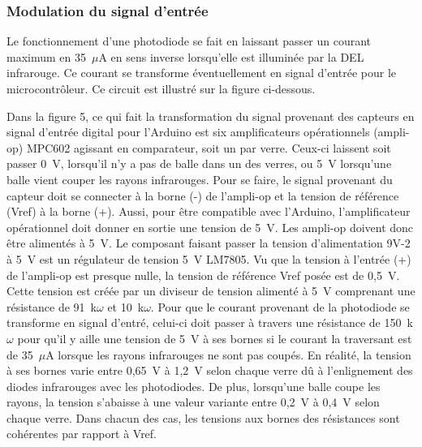 \subsubsection{Modulation du signal d’entrée}

Le fonctionnement d’une photodiode se fait en laissant passer un courant maximum en 35~$\mu$A en sens inverse lorsqu’elle est illuminée par la DEL infrarouge.
Ce courant se transforme éventuellement en signal d’entrée pour le microcontrôleur.
Ce circuit est illustré sur la figure ci-dessous.


Dans la figure 5, ce qui fait la transformation du signal provenant des capteurs en signal d’entrée digital pour l’Arduino est six amplificateurs opérationnels (ampli-op) MPC602 agissant en comparateur, soit un par verre.
Ceux-ci laissent soit passer 0~V, lorsqu’il n’y a pas de balle dans un des verres, ou 5~V lorsqu’une balle vient couper les rayons infrarouges.
Pour se faire, le signal provenant du capteur doit se connecter à la borne (-) de l’ampli-op et la tension de référence (Vref) à la borne (+).
Aussi, pour être compatible avec l’Arduino, l’amplificateur opérationnel doit donner en sortie une tension de 5~V.
Les ampli-op doivent donc être alimentés à 5~V.
Le composant faisant passer la tension d’alimentation 9V-2 à 5~V est un régulateur de tension 5~V LM7805.
Vu que la tension à l’entrée (+) de l’ampli-op est presque nulle, la tension de référence Vref posée est de 0,5~V.
Cette tension est créée par un diviseur de tension alimenté à 5~V comprenant une résistance de 91~k$\omega$ et 10~k$\omega$.
Pour que le courant provenant de la photodiode se transforme en signal d'entré, celui-ci doit passer à travers une résistance de 150~k$\omega$ pour qu’il y aille une tension de 5~V à ses bornes si le courant la traversant est de 35~$\mu$A lorsque les rayons infrarouges ne sont pas coupés.
En réalité, la tension à ses bornes varie entre 0,65~V à 1,2~V selon chaque verre dû à l’enlignement des diodes infrarouges avec les photodiodes.
De plus, lorsqu’une balle coupe les rayons, la tension s’abaisse à une valeur variante entre 0,2~V à 0,4~V selon chaque verre.
Dans chacun des cas, les tensions aux bornes des résistances sont cohérentes par rapport à Vref.

